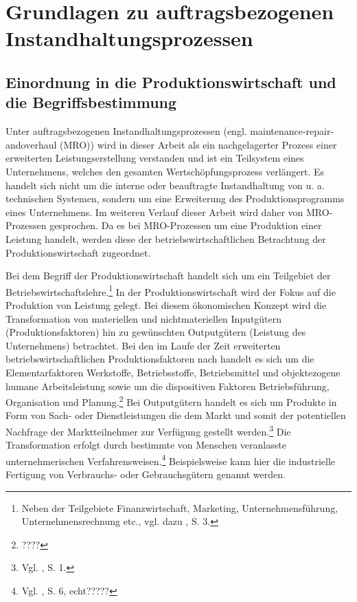 \chapter{Grundlagen zu auftragsbezogenen Instandhaltungsprozessen}
\setcounter{footnote}{4}  %

\section{Einordnung in die Produktionswirtschaft und die Begriffsbestimmung}

Unter auftragsbezogenen Instandhaltungsprozessen (engl. maintenance-repair-and\-overhaul (MRO)) wird in dieser Arbeit als ein nachgelagerter Prozess einer erweiterten Leistungserstellung verstanden und ist ein Teilsystem eines Unternehmens, welches den gesamten Wertschöpfungsprozess verlängert. Es handelt sich nicht um die interne oder beauftragte Instandhaltung von u. a. technischen Systemen, sondern um eine Erweiterung des Produktionsprogramms eines Unternehmens. Im weiteren Verlauf dieser Arbeit wird daher von MRO-Prozessen gesprochen. Da es bei MRO-Prozessen um eine Produktion einer Leistung handelt, werden diese der betriebswirtschaftlichen Betrachtung der Produktionswirtschaft zugeordnet.

Bei dem Begriff der Produktionswirtschaft handelt sich um ein Teilgebiet der Betriebswirtschaftslehre.\footnote{Neben der Teilgebiete Finanzwirtschaft, Marketing, Unternehmensführung, Unternehmensrechnung etc., vgl. dazu \cite{Dyckhoff2010}, S. 3.} In der Produktionswirtschaft wird der Fokus auf die Produktion von Leistung gelegt. Bei diesem ökonomischen Konzept wird die Transformation von materiellen und nichtmateriellen Inputgütern (Produktionsfaktoren) hin zu gewünschten Outputgütern (Leistung des Unternehmens) betrachtet. Bei den im Laufe der Zeit erweiterten betriebswirtschaftlichen Produktionsfaktoren nach \citet[S. 71]{Gutenberg:1959aa} handelt es sich um die Elementarfaktoren Werkstoffe, Betriebsstoffe, Betriebsmittel und objektezogene humane Arbeitsleistung sowie um die dispositiven Faktoren Betriebsführung, Organisation und Planung.\footnote{????} Bei Outputgütern handelt es sich um Produkte in Form von Sach- oder Dienstleistungen die dem Markt und somit der potentiellen Nachfrage der Marktteilnehmer zur Verfügung gestellt werden.\footnote{Vgl. \cite{Schmidt:2012aa}, S. 1.} Die Transformation erfolgt durch bestimmte von Menschen veranlasste unternehmerischen Verfahrensweisen.\footnote{Vgl. \cite{tempelmeier1994produktion}, S. 6, echt?????} Beispielsweise kann hier die industrielle Fertigung von Verbrauchs- oder Gebrauchsgütern genannt werden.

